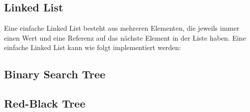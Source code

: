 \documentclass[
../../AuD-Zusammenfassung.tex,
]
{subfiles}
\begin{document}

\newpage
\subsection{Linked List}
Eine einfache Linked List besteht aus mehreren Elementen, die jeweils immer einen Wert und eine Referenz auf das nächste Element in der Liste haben. Eine einfache Linked List kann wie folgt implementiert werden:





\newpage
\subsection{Binary Search Tree}


\newpage

\newpage




\newpage
\subsection{Red-Black Tree}







\end{document}
